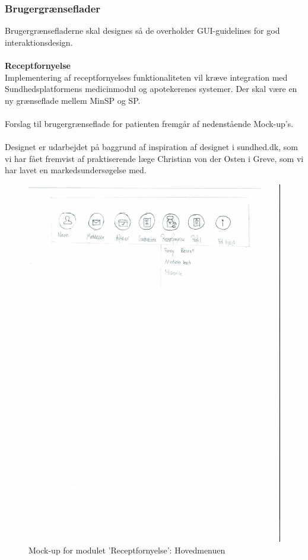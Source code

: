 \subsubsection{Brugergrænseflader} %
Brugergrænsefladerne skal designes så de overholder GUI-guidelines for god interaktionsdesign. %
\\\\
\textbf{Receptfornyelse} \\
Implementering af receptfornyelses funktionaliteten vil kræve integration med Sundhedsplatformens medicinmodul og apotekerenes systemer. 
Der skal være en ny grænseflade mellem MinSP og SP. \\\\
Forslag til brugergrænseflade for patienten fremgår af nedenstående Mock-up's. \\
\\
Designet er udarbejdet på baggrund af inspiration af designet i sundhed.dk, som vi har fået fremvist af praktiserende læge Christian von der Osten i Greve, som vi har lavet en markedsundersøgelse med.\\
\begin{figure}[H]
	\centering
	\includegraphics[angle=0, width=\linewidth]{Materials/FornyRecept_Hovedmenu.pdf}
	\caption{Mock-up for modulet 'Receptfornyelse': Hovedmenuen}
	\label{fig:Mock-Up1}
\end{figure}
